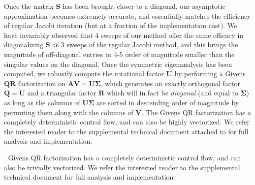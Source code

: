 Once the matrix $\mathbf{S}$ has been brought closer to a diagonal, our asymptotic approximation becomes extremely accurate, and essentially matches the efficiency of regular Jacobi
iteration (but at a fraction of the implementation cost). We have invariably observed that 4 sweeps of our method offer the same efficacy in diagonalizing $\mathbf{S}$ as 3 sweeps of the
regular Jacobi method, and this brings the magnitude of off-diagonal entries to 4-5 order of magnitude smaller than the singular values on the diagonal. Once the symmetric eigenanalysis
has been computed, we robustly compute the rotational factor $\mathbf{U}$ by performing a Givens $\mathbf{QR}$ factorization on $\mathbf{AV}=\mathbf{U\Sigma}$, which generates an exactly
orthogonal factor $\mathbf{Q}=\mathbf{U}$ and a triangular factor $\mathbf{R}$ which will in fact be \emph{diagonal} (and equal to $\mathbf{\Sigma}$) as long as the columns of
$\mathbf{U\Sigma}$ are sorted in descending order of magnitude by permuting them along with the columns of $\mathbf{V}$. The Givens QR factorization has a completely deterministic
control flow, and can also be highly vectorized. We refer the interested reader
to the supplemental technical document attached to \cite{mcadams:2011:elasticity} for full analysis and implementation.

 \cite{Rivers:2007:FFL}.   Givens QR factorization has a
completely deterministic control flow, and can also be trivially vectorized. We refer the interested reader to the supplemental technical document for full analysis and
implementation 
